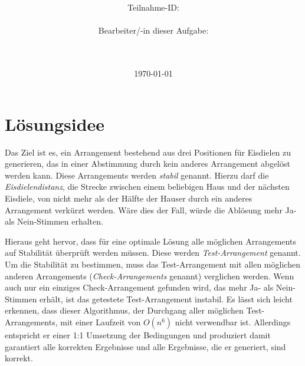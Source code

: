 \documentclass[a4paper,10pt,ngerman,captions=figureheading]{scrartcl}
\title{\textbf{\Huge\Aufgabe}}
\author{\LARGE Teilnahme-ID: \LARGE \TeilnahmeId \\\\
	    \LARGE Bearbeiter/-in dieser Aufgabe: \\ 
	    \LARGE \Name\\\\}
\date{\LARGE\today}
\begin{document}
\maketitle
\tableofcontents

\vspace{0.5cm}

\section{Lösungsidee}
Das Ziel ist es, ein Arrangement bestehend aus drei Positionen für Eisdielen zu generieren, das in einer Abstimmung durch kein anderes Arrangement abgelöst werden kann.
Diese Arrangements werden \emph{stabil} genannt.
Hierzu darf die \emph{Eisdielendistanz}, die Strecke zwischen einem beliebigen Haus und der nächsten Eisdiele, von nicht mehr als der Hälfte der Hauser durch ein anderes Arrangement verkürzt werden.
Wäre dies der Fall, würde die Ablösung mehr Ja- als Nein-Stimmen erhalten.

Hieraus geht hervor, dass für eine optimale Lösung alle möglichen Arrangements auf Stabilität überprüft werden müssen.
Diese werden \emph{Test-Arrangement} genannt.
Um die Stabilität zu bestimmen, muss das Test-Arrangement mit allen möglichen anderen Arrangements (\emph{Check-Arrangements} genannt) verglichen werden.
Wenn auch nur ein einziges Check-Arrangement gefunden wird, das mehr Ja- als Nein-Stimmen erhält, ist das getestete Test-Arrangement instabil.
Es lässt sich leicht erkennen, dass dieser Algorithmus, der Durchgang aller möglichen Test-Arrangements, mit einer Laufzeit von $O(n^6)$ nicht verwendbar ist.
Allerdings entspricht er einer 1:1 Umsetzung der Bedingungen und produziert damit garantiert alle korrekten Ergebnisse und alle Ergebnisse, die er generiert, sind korrekt.
\end{document}
